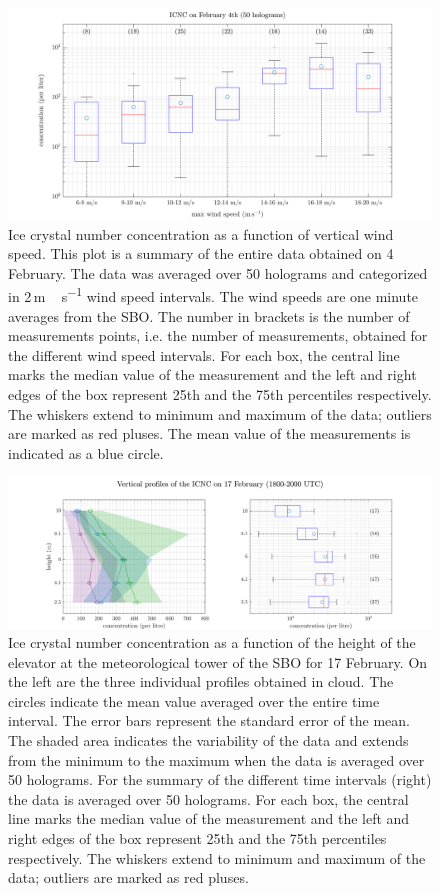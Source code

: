 \documentclass[draft,linenumbers]{agujournal}
\begin{document}
\begin{figure}[h]
 \centering
 	\includegraphics[width=14cm]{0402_WSMax.png}
 \caption{Ice crystal number concentration as a function of vertical wind speed. This plot is a summary of the entire data obtained on 4 February. The data was averaged over 50 holograms and categorized in 2\,\si{m\,s^{-1}} wind speed intervals. The wind speeds are one minute averages from the SBO. The number in brackets is the number of measurements points, i.e. the number of measurements, obtained for the different wind speed intervals. For each box, the central line marks the median value of the measurement and the left and right edges of the box represent 25th and the 75th percentiles respectively. The whiskers extend to minimum and maximum of the data; outliers are marked as red pluses. The mean value of the measurements is indicated as a blue circle.}
 \label{fig:ICNCvsWSMAX0402}
\end{figure}

\begin{figure}[h]
 \centering
 	\includegraphics[width=14cm]{1702_Overview.png}
 \caption{Ice crystal number concentration as a function of the height of the elevator at the meteorological tower of the SBO for 17 February. On the left are the three individual profiles obtained in cloud. The circles indicate the mean value averaged over the entire time interval. The error bars represent the standard error of the mean. The shaded area indicates the variability of the data and extends from the minimum to the maximum when the data is averaged over 50 holograms. For the summary of the different time intervals (right) the data is averaged over 50 holograms. For each box, the central line marks the median value of the measurement and the left and right edges of the box represent 25th and the 75th percentiles respectively. The whiskers extend to minimum and maximum of the data; outliers are marked as red pluses.}
 \label{fig:profiles1702}
\end{figure}
\end{document}
